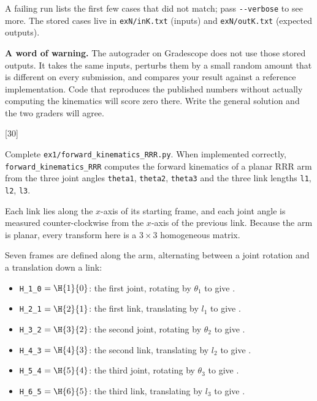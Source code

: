 \documentclass{16384_doc}
\begin{document}
A failing run lists the first few cases that did not match; pass
\verb!--verbose! to see more. The stored cases live in \verb!exN/inK.txt!
(inputs) and \verb!exN/outK.txt! (expected outputs).

\textbf{A word of warning.} The autograder on Gradescope does not use those
stored outputs. It takes the same inputs, perturbs them by a small random
amount that is different on every submission, and compares your result against
a reference implementation. Code that reproduces the published numbers without
actually computing the kinematics will score zero there. Write the general
solution and the two graders will agree.

\begin{questions}

    [30]

Complete \verb!ex1/forward_kinematics_RRR.py!. When implemented correctly,\\
\verb!forward_kinematics_RRR! computes the forward kinematics of a planar RRR
arm from the three joint angles \verb!theta1!, \verb!theta2!, \verb!theta3! and
the three link lengths \verb!l1!, \verb!l2!, \verb!l3!.

Each link lies
along the $x$-axis of its starting frame, and each joint angle is measured
counter-clockwise from the $x$-axis of the previous link. Because the arm is
planar, every transform here is a $3 \times 3$ homogeneous matrix.

Seven frames are defined along the arm, alternating between a joint rotation
and a translation down a link:

\begin{itemize}
    \item \verb!H_1_0! $= \H{1}{0}$: the first joint, rotating  by $\theta_1$ to give .
    \item \verb!H_2_1! $= \H{2}{1}$: the first link, translating  by $l_1$ to give .
    \item \verb!H_3_2! $= \H{3}{2}$: the second joint, rotating  by $\theta_2$ to give .
    \item \verb!H_4_3! $= \H{4}{3}$: the second link, translating  by $l_2$ to give .
    \item \verb!H_5_4! $= \H{5}{4}$: the third joint, rotating  by $\theta_3$ to give .
    \item \verb!H_6_5! $= \H{6}{5}$: the third link, translating  by $l_3$ to give .
\end{itemize}


\end{questions}
\end{document}
